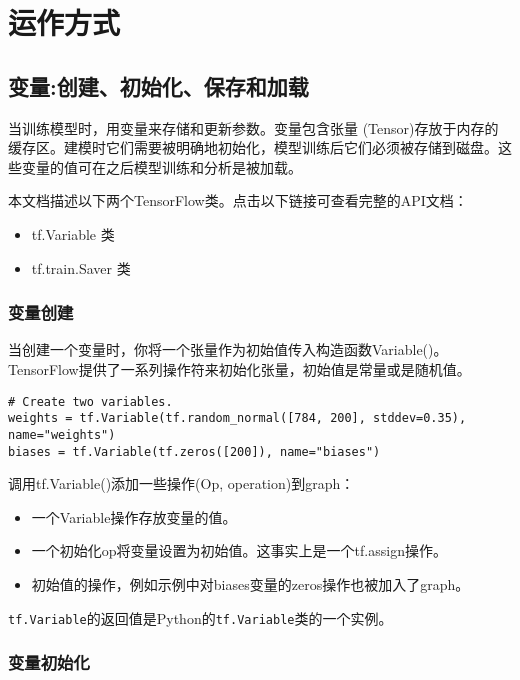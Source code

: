 


\chapter{运作方式}

\section{变量:创建、初始化、保存和加载}

当训练模型时，用变量来存储和更新参数。变量包含张量 (Tensor)存放于内存的缓存区。建模时它们需要被明确地初始化，模型训练后它们必须被存储到磁盘。这些变量的值可在之后模型训练和分析是被加载。

本文档描述以下两个TensorFlow类。点击以下链接可查看完整的API文档：
\begin{itemize}
  \item tf.Variable 类 %
  \item tf.train.Saver 类 %
\end{itemize}

\subsection {变量创建}

当创建一个变量时，你将一个张量作为初始值传入构造函数Variable()。TensorFlow提供了一系列操作符来初始化张量，初始值是常量或是随机值。

\begin{lstlisting}
# Create two variables.
weights = tf.Variable(tf.random_normal([784, 200], stddev=0.35), name="weights")
biases = tf.Variable(tf.zeros([200]), name="biases")
\end{lstlisting}

调用tf.Variable()添加一些操作(Op, operation)到graph：
\begin{itemize}
  \item 一个Variable操作存放变量的值。
  \item 一个初始化op将变量设置为初始值。这事实上是一个tf.assign操作。
  \item 初始值的操作，例如示例中对biases变量的zeros操作也被加入了graph。
\end{itemize}
\lstinline{tf.Variable}的返回值是Python的\lstinline{tf.Variable}类的一个实例。

\subsection {变量初始化}

